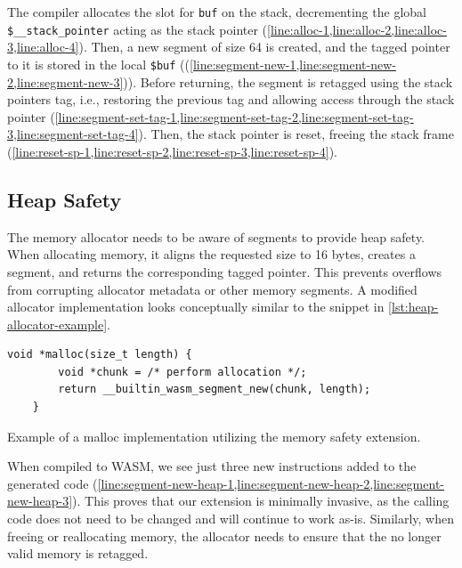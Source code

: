 The compiler allocates the slot for \texttt{buf} on the stack, decrementing the global \texttt{\$\_\_stack\_pointer} acting as the stack pointer (\cref{line:alloc-1,line:alloc-2,line:alloc-3,line:alloc-4}).
Then, a new segment of size 64 is created, and the tagged pointer to it is stored in the local \lstinline[style=customwasm]{$buf} ((\cref{line:segment-new-1,line:segment-new-2,line:segment-new-3})).
Before returning, the segment is retagged using the stack pointers tag, i.e., restoring the previous tag and allowing access through the stack pointer (\cref{line:segment-set-tag-1,line:segment-set-tag-2,line:segment-set-tag-3,line:segment-set-tag-4}).
Then, the stack pointer is reset, freeing the stack frame (\cref{line:reset-sp-1,line:reset-sp-2,line:reset-sp-3,line:reset-sp-4}).

\subsection{Heap Safety}
\label{subsec:heap-safety}

The memory allocator needs to be aware of segments to provide heap safety.
When allocating memory, it aligns the requested size to 16 bytes, creates a segment, and returns the corresponding tagged pointer.
This prevents overflows from corrupting allocator metadata or other memory segments.
A modified allocator implementation looks conceptually similar to the snippet in \cref{lst:heap-allocator-example}.

\begin{lstfloat}
    \begin{lstlisting}[frame=h,style=customc,
        label={lst:heap-allocator-example-inner}]
    void *malloc(size_t length) {
        void *chunk = /* perform allocation */;
        return __builtin_wasm_segment_new(chunk, length);
    }
    \end{lstlisting}
    \caption{Example of a malloc implementation utilizing the memory safety extension.}
    \label{lst:heap-allocator-example}
\end{lstfloat}

\noindent
When compiled to \ac{WASM}, we see just three new instructions added to the generated code (\cref{line:segment-new-heap-1,line:segment-new-heap-2,line:segment-new-heap-3}).
This proves that our extension is minimally invasive, as the calling code does not need to be changed and will continue to work as-is.
Similarly, when freeing or reallocating memory, the allocator needs to ensure that the no longer valid memory is retagged.

